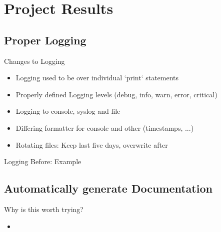 \section{Project Results}

% 

\subsection{Proper Logging}

\begin{frame}[c]{Changes to Logging}
    \large
    \begin{itemize}[<+(1)->]
        \item Logging used to be over individual `print` statements
        \item Properly defined Logging levels (debug, info, warn, error, critical)
        \item Logging to console, syslog and file
        \item Differing formatter for console and other (timestamps, ...)
        \item Rotating files: Keep last five days, overwrite after
    \end{itemize}
\end{frame}

\begin{frame}[c]{Logging Before: Example} 
\end{frame}


\subsection{Automatically generate Documentation}

\begin{frame}[c]{Why is this worth trying?} 
    \begin{itemize}[<+(1)->]
        \item 
    \end{itemize}
\end{frame}

